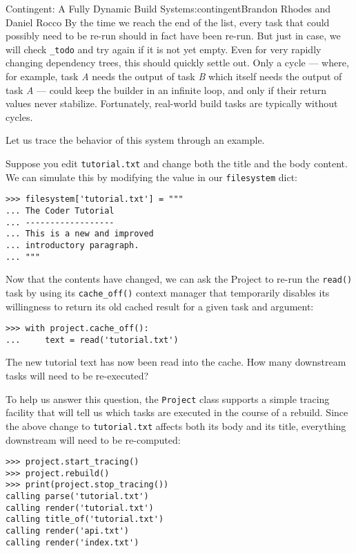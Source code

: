 \begin{aosachapter}{Contingent: A Fully Dynamic Build System}{s:contingent}{Brandon Rhodes and Daniel Rocco}
By the time we reach the end of the list, every task that could possibly
need to be re-run should in fact have been re-run. But just in case, we
will check \texttt{\_todo} and try again if it is not yet empty. Even
for very rapidly changing dependency trees, this should quickly settle
out. Only a cycle --- where, for example, task \emph{A} needs the output
of task \emph{B} which itself needs the output of task \emph{A} ---
could keep the builder in an infinite loop, and only if their return
values never stabilize. Fortunately, real-world build tasks are
typically without cycles.

Let us trace the behavior of this system through an example.

Suppose you edit \texttt{tutorial.txt} and change both the title and the
body content. We can simulate this by modifying the value in our
\texttt{filesystem} dict:

\begin{verbatim}
>>> filesystem['tutorial.txt'] = """
... The Coder Tutorial
... ------------------
... This is a new and improved
... introductory paragraph.
... """
\end{verbatim}

Now that the contents have changed, we can ask the Project to re-run the
\texttt{read()} task by using its \texttt{cache\_off()} context manager
that temporarily disables its willingness to return its old cached
result for a given task and argument:

\begin{verbatim}
>>> with project.cache_off():
...     text = read('tutorial.txt')
\end{verbatim}

The new tutorial text has now been read into the cache. How many
downstream tasks will need to be re-executed?

To help us answer this question, the \texttt{Project} class supports a
simple tracing facility that will tell us which tasks are executed in
the course of a rebuild. Since the above change to \texttt{tutorial.txt}
affects both its body and its title, everything downstream will need to
be re-computed:

\begin{verbatim}
>>> project.start_tracing()
>>> project.rebuild()
>>> print(project.stop_tracing())
calling parse('tutorial.txt')
calling render('tutorial.txt')
calling title_of('tutorial.txt')
calling render('api.txt')
calling render('index.txt')
\end{verbatim}


\end{aosachapter}
